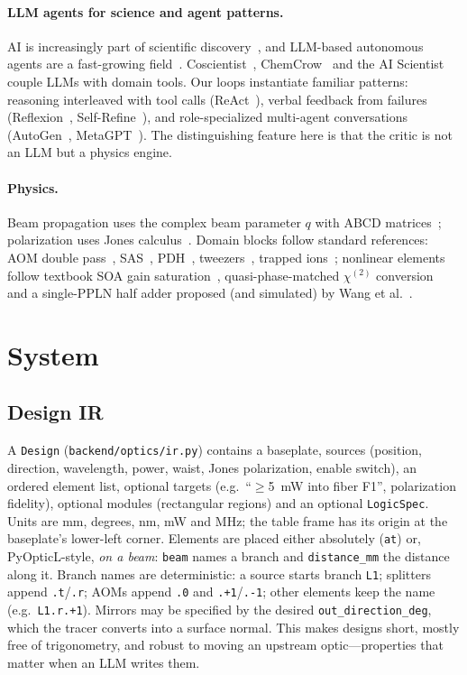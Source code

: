 \documentclass[10pt,twocolumn,letterpaper]{article}
\newcommand{\code}[1]{\texttt{\small #1}}
\begin{document}
\paragraph{LLM agents for science and agent patterns.} AI is increasingly part of scientific discovery~\cite{wang2023aisci}, and LLM-based autonomous agents are a fast-growing field~\cite{wang2024agentsurvey}. Coscientist~\cite{coscientist2023}, ChemCrow~\cite{chemcrow2024} and the AI Scientist~\cite{aiscientist2024} couple LLMs with domain tools. Our loops instantiate familiar patterns: reasoning interleaved with tool calls (ReAct~\cite{react2023}), verbal feedback from failures (Reflexion~\cite{reflexion2023}, Self-Refine~\cite{selfrefine2023}), and role-specialized multi-agent conversations (AutoGen~\cite{autogen2023}, MetaGPT~\cite{metagpt2024}). The distinguishing feature here is that the critic is not an LLM but a physics engine.

\paragraph{Physics.} Beam propagation uses the complex beam parameter $q$ with ABCD matrices~\cite{kogelnik1966,siegman1986,self1983}; polarization uses Jones calculus~\cite{jones1941}. Domain blocks follow standard references: AOM double pass~\cite{donley2005}, SAS~\cite{preston1996}, PDH~\cite{black2001}, tweezers~\cite{ashkin1986,gieseler2021}, trapped ions~\cite{bruzewicz2019}; nonlinear elements follow textbook SOA gain saturation~\cite{stubkjaer2000}, quasi-phase-matched $\chi^{(2)}$ conversion~\cite{pplnqpm} and a single-PPLN half adder proposed (and simulated) by Wang et al.~\cite{sfglogic}.

\section{System}
\label{sec:system}

\subsection{Design IR}
\label{sec:ir}
A \code{Design} (\code{backend/optics/ir.py}) contains a baseplate, sources (position, direction, wavelength, power, waist, Jones polarization, enable switch), an ordered element list, optional targets (e.g.\ ``$\ge$\SI{5}{\milli\watt} into fiber F1'', polarization fidelity), optional modules (rectangular regions) and an optional \code{LogicSpec}. Units are mm, degrees, nm, mW and MHz; the table frame has its origin at the baseplate's lower-left corner. Elements are placed either absolutely (\code{at}) or, PyOpticL-style, \emph{on a beam}: \code{beam} names a branch and \code{distance\_mm} the distance along it. Branch names are deterministic: a source starts branch \code{L1}; splitters append \code{.t}/\code{.r}; AOMs append \code{.0} and \code{.+1}/\code{.-1}; other elements keep the name (e.g.\ \code{L1.r.+1}). Mirrors may be specified by the desired \code{out\_direction\_deg}, which the tracer converts into a surface normal. This makes designs short, mostly free of trigonometry, and robust to moving an upstream optic---properties that matter when an LLM writes them.
\end{document}
